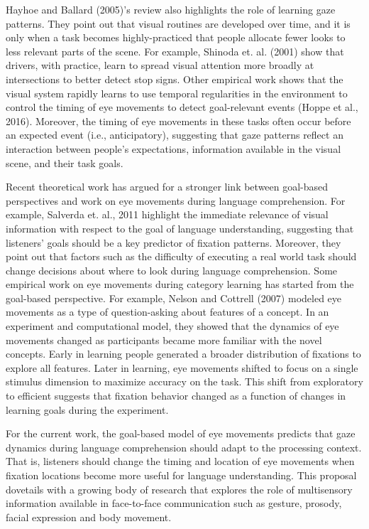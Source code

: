 \documentclass[english,floatsintext,man]{apa6}
\theoremstyle{definition}
\theoremstyle{definition}
\theoremstyle{definition}
\theoremstyle{remark}
\begin{document}
Hayhoe and Ballard (2005)'s review also highlights the role of learning
gaze patterns. They point out that visual routines are developed over
time, and it is only when a task becomes highly-practiced that people
allocate fewer looks to less relevant parts of the scene. For example,
Shinoda et. al. (2001) show that drivers, with practice, learn to spread
visual attention more broadly at intersections to better detect stop
signs. Other empirical work shows that the visual system rapidly learns
to use temporal regularities in the environment to control the timing of
eye movements to detect goal-relevant events (Hoppe et al., 2016).
Moreover, the timing of eye movements in these tasks often occur before
an expected event (i.e., anticipatory), suggesting that gaze patterns
reflect an interaction between people's expectations, information
available in the visual scene, and their task goals.

Recent theoretical work has argued for a stronger link between
goal-based perspectives and work on eye movements during language
comprehension. For example, Salverda et. al., 2011 highlight the
immediate relevance of visual information with respect to the goal of
language understanding, suggesting that listeners' goals should be a key
predictor of fixation patterns. Moreover, they point out that factors
such as the difficulty of executing a real world task should change
decisions about where to look during language comprehension. Some
empirical work on eye movements during category learning has started
from the goal-based perspective. For example, Nelson and Cottrell (2007)
modeled eye movements as a type of question-asking about features of a
concept. In an experiment and computational model, they showed that the
dynamics of eye movements changed as participants became more familiar
with the novel concepts. Early in learning people generated a broader
distribution of fixations to explore all features. Later in learning,
eye movements shifted to focus on a single stimulus dimension to
maximize accuracy on the task. This shift from exploratory to efficient
suggests that fixation behavior changed as a function of changes in
learning goals during the experiment.

For the current work, the goal-based model of eye movements predicts
that gaze dynamics during language comprehension should adapt to the
processing context. That is, listeners should change the timing and
location of eye movements when fixation locations become more useful for
language understanding. This proposal dovetails with a growing body of
research that explores the role of multisensory information available in
face-to-face communication such as gesture, prosody, facial expression
and body movement.
\end{document}

